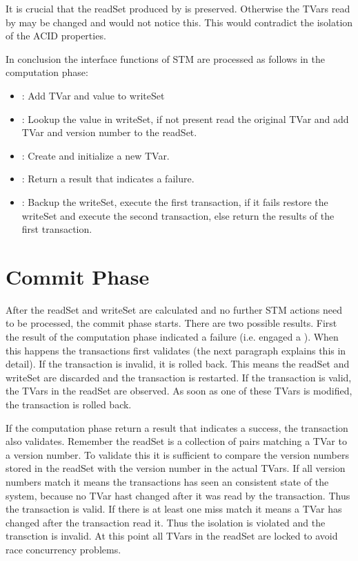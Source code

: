 It is crucial that the readSet produced by  is preserved. Otherwise the TVars read by  may be changed and 
 would not notice this. This would contradict the isolation of the ACID properties. 

In conclusion the interface functions of STM are processed as follows in the computation phase:
\begin{itemize}
 \item {}: Add TVar and value to writeSet
 \item {}: Lookup the value in writeSet, if not present read the original TVar and add TVar and version number to the readSet.
 \item {}: Create and initialize a new TVar. 
 \item {}: Return a result that indicates a failure.
 \item {}: Backup the writeSet, execute the first transaction, if it fails restore the writeSet and execute the second transaction, else return the results of the first transaction.
\end{itemize}

\section{Commit Phase}
After the readSet and writeSet are calculated and no further STM actions need to be processed, the commit phase starts.
There are two possible results. First the result of the computation phase indicated a failure (i.e. engaged a ).
When this happens the transactions first validates (the next paragraph explains this in detail). If the transaction is invalid, 
it is rolled back. This means the readSet and writeSet are discarded and the transaction is restarted. If the transaction is
valid, the TVars in the readSet are observed. As soon as one of these TVars is modified, the transaction is rolled back.

If the computation phase return a result that indicates a success, the transaction also validates.
Remember the readSet is a collection of pairs matching a TVar to a version number.
To validate this it is sufficient to compare the version numbers stored in the readSet with the 
version number in the actual TVars. If all version numbers match it means the transactions has seen an consistent state
of the system, because no TVar hast changed after it was read by the transaction. Thus the transaction is valid.
If there is at least one miss match it means a TVar has changed after the transaction read it. Thus the isolation
is violated and the transction is invalid. At this point all TVars in the readSet are locked to avoid race concurrency problems. 

